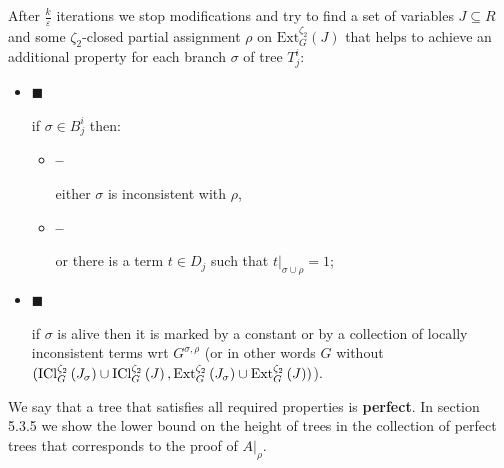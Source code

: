 After $\frac{k}{\varepsilon}$ iterations we stop modifications and try to find a set of variables $J\subseteq R$ and some $\zeta_{2}$-closed partial assignment $\rho$ on $\mathrm{Ext}_{G}^{\zeta_{2}}\left(J\right)$ that helps to
achieve an additional property for each branch $\sigma$ of tree $T^{i}_{j}$:\par


\begin{itemize}


\item[] 
$\blacksquare$ 


if $\sigma\in B^{i}_{j}$ then:\par


\begin{itemize}


\item[] 
\textbf{–} 


either $\sigma$ is inconsistent with $\rho$,\par





\item[] 
\textbf{–} 


or there is a term $t\in D_{j}$ such that $t|_{\sigma\cup\rho}=1$;\par





\end{itemize}





\item[] 
$\blacksquare$ 


if $\sigma$ is alive then it is marked by a constant or by a collection of locally
inconsistent terms wrt $G^{\sigma,\rho}$ (or in other words $G$ without
$(\mathrm{ICl}_{G}^{\zeta_{2}}\left(J_{\sigma}\right)\cup\mathrm{ICl}_{G}^{%
\zeta_{2}}\left(J\right),\mathrm{Ext}_{G}^{\zeta_{2}}\left(J_{\sigma}\right)%
\cup\mathrm{Ext}_{G}^{\zeta_{2}}\left(J\right))$).\par





\end{itemize}


We say that a tree that satisfies all required properties is \textbf{perfect}. In section
5.3.5 we show the lower bound on the height of trees in the collection of perfect
trees that corresponds to the proof of $A|_{\rho}$.\par





